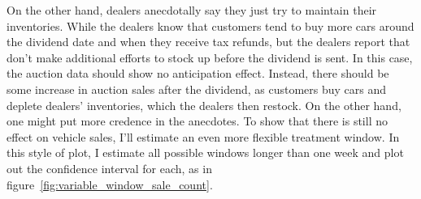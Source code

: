 \documentclass[11pt,letterpaper,oneside]{article}
\newcommand{\snippet}[1]{\hspace{-0.15em}}
\begin{document}
\begin{doublespacing}
On the other hand, dealers anecdotally say they just try to maintain their inventories.
While the dealers know that customers tend to  buy more cars around the dividend date and when they receive tax refunds, but the dealers report that don't make additional efforts to stock up before the dividend is sent.
In this case, the auction data should show no anticipation effect.
Instead, there should be some increase in auction sales after the dividend, as customers buy cars and deplete dealers' inventories, which the dealers then restock.
On the other hand, one might put more credence in the anecdotes.
To show that there is still no effect on vehicle sales, I'll estimate an even more flexible treatment window.
In this style of plot, I estimate all possible windows longer than one week and plot out the confidence interval for each, as in figure~\ref{fig:variable_window_sale_count}.




%



\end{doublespacing}
\end{document}
